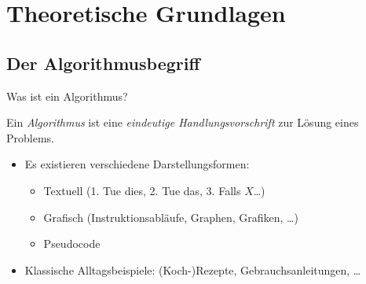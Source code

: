 \section{Theoretische Grundlagen}
\subsection{Der Algorithmusbegriff}
\begin{frame}{Was ist ein Algorithmus?}
    \pause{}
    \begin{definition}[Algorithmus]
        \pause{}Ein \emph{Algorithmus} ist eine \emph{eindeutige Handlungsvorschrift} zur Lösung eines Problems.
    \end{definition}
    \begin{itemize}[<+(1)->]
        \widei
        \item Es existieren verschiedene Darstellungsformen: \begin{itemize}
            \item Textuell \pause(1. Tue dies, 2. Tue das, 3. Falls \(X\)\ldots)
            \item Grafisch \pause(Instruktionsabläufe, Graphen, Grafiken, \ldots)
            \item Pseudocode
        \end{itemize}
        \item Klassische Alltagsbeispiele:\pause{} (Koch-)Rezepte,\pause{} Gebrauchsanleitungen,\pause{} \ldots
    \end{itemize}
\end{frame}

